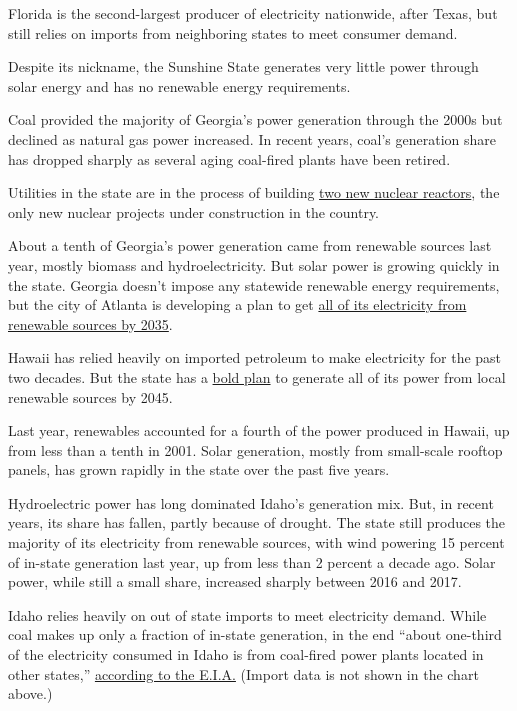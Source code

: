 Florida is the second-largest producer of electricity nationwide, after
Texas, but still relies on imports from neighboring states to meet
consumer demand.

Despite its nickname, the Sunshine State generates very little power
through solar energy and has no renewable energy requirements.

Coal provided the majority of Georgia's power generation through the
2000s but declined as natural gas power increased. In recent years,
coal's generation share has dropped sharply as several aging coal-fired
plants have been retired.

Utilities in the state are in the process of building
\href{https://www.nytimes3xbfgragh.onion/2017/08/31/business/georgia-vogtle-nuclear-reactors.html}{two
new nuclear reactors}, the only new nuclear projects under construction
in the country.

About a tenth of Georgia's power generation came from renewable sources
last year, mostly biomass and hydroelectricity. But solar power is
growing quickly in the state. Georgia doesn't impose any statewide
renewable energy requirements, but the city of Atlanta is developing a
plan to get \href{http://100atl.com/}{all of its electricity from
renewable sources by 2035}.

Hawaii has relied heavily on imported petroleum to make electricity for
the past two decades. But the state has a
\href{http://energy.hawaii.gov/renewable-energy}{bold plan} to generate
all of its power from local renewable sources by 2045.

Last year, renewables accounted for a fourth of the power produced in
Hawaii, up from less than a tenth in 2001. Solar generation, mostly from
small-scale rooftop panels, has grown rapidly in the state over the past
five years.

Hydroelectric power has long dominated Idaho's generation mix. But, in
recent years, its share has fallen, partly because of drought. The state
still produces the majority of its electricity from renewable sources,
with wind powering 15 percent of in-state generation last year, up from
less than 2 percent a decade ago. Solar power, while still a small
share, increased sharply between 2016 and 2017.

Idaho relies heavily on out of state imports to meet electricity demand.
While coal makes up only a fraction of in-state generation, in the end
``about one-third of the electricity consumed in Idaho is from
coal-fired power plants located in other states,''
\href{https://www.eia.gov/state/analysis.php?sid=ID\#51}{according to
the E.I.A.} (Import data is not shown in the chart above.)


